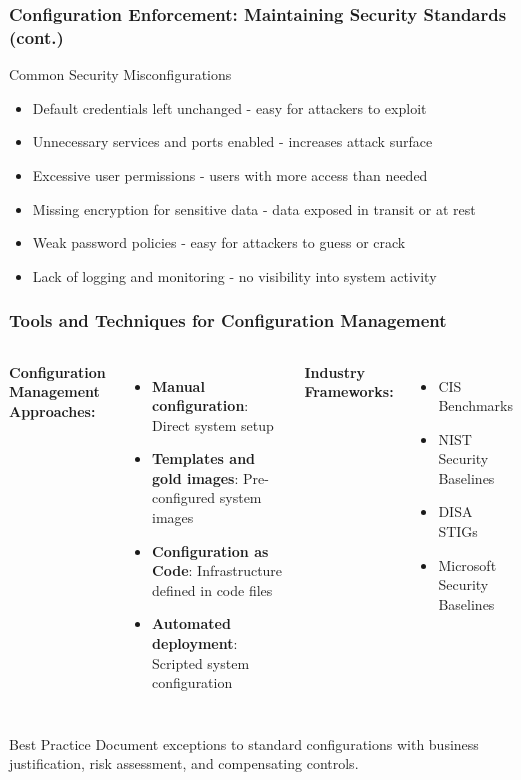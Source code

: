 \documentclass{beamer}
\begin{document}
    \begin{frame}
    \frametitle{Configuration Enforcement: Maintaining Security Standards (cont.)}
    \begin{exampleblock}{Common Security Misconfigurations}
        \begin{itemize}
        \item Default credentials left unchanged - easy for attackers to exploit
        \item Unnecessary services and ports enabled - increases attack surface
        \item Excessive user permissions - users with more access than needed
        \item Missing encryption for sensitive data - data exposed in transit or at rest
        \item Weak password  policies - easy for attackers to guess or crack
        \item Lack of logging and monitoring - no visibility into system activity
        \end{itemize}
        \end{exampleblock}
    \end{frame}
    
    \begin{frame}
    \frametitle{Tools and Techniques for Configuration Management}
    
    \begin{columns}[t]
    \textbf{Configuration Management Approaches:}
    \begin{itemize}
    \item \textbf{Manual configuration}: Direct system setup
    \item \textbf{Templates and gold images}: Pre-configured system images
    \item \textbf{Configuration as Code}: Infrastructure defined in code files
    \item \textbf{Automated deployment}: Scripted system configuration
    \end{itemize}
    
    \textbf{Industry Frameworks:}
    \begin{itemize}
    \item CIS Benchmarks
    \item NIST Security Baselines
    \item DISA STIGs
    \item Microsoft Security Baselines
    \end{itemize}
    \end{columns}
    
    \vspace{0.5cm}
    \begin{alertblock}{Best Practice}
    Document exceptions to standard configurations with business justification, risk assessment, and compensating controls.
    \end{alertblock}
    \end{frame}
    
\end{document}
